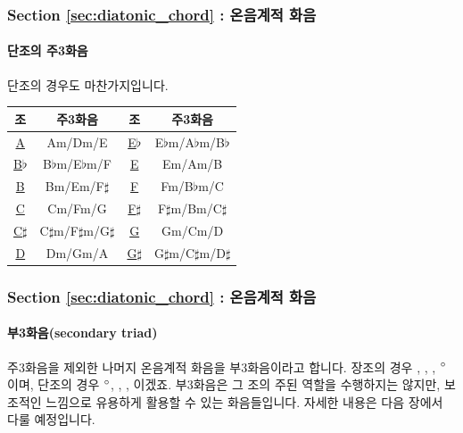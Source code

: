 \documentclass{beamer}
\newcommand{\Rn}[1]{%
	\textup{\uppercase\expandafter{\romannumeral#1}}%
}
\newcommand{\rn}[1]{%
	\textup{\lowercase\expandafter{\romannumeral#1}}%
}
\begin{document}
	\begin{frame}
		\frametitle{Section \ref{sec:diatonic_chord} : 온음계적 화음}
		\framesubtitle{단조의 주3화음}
		단조의 경우도 마찬가지입니다.
		\begin{table}
			\begin{tabular}{||c|c||c|c||}
				\hline
				조 & 주3화음 & 조 & 주3화음 \\ \hline
				{\color{cyan}\href{run:res/mp3/10/chord/primary_minor_triad_A.mp3}{A}} & Am/Dm/E & {\color{cyan}\href{run:res/mp3/10/chord/primary_minor_triad_E_flat.mp3}{E$\flat$}} & E$\flat$m/A$\flat$m/B$\flat$ \\ \hline
				{\color{cyan}\href{run:res/mp3/10/chord/primary_minor_triad_B_flat.mp3}{B$\flat$}} & B$\flat$m/E$\flat$m/F& {\color{cyan}\href{run:res/mp3/10/chord/primary_minor_triad_E.mp3}{E}} & Em/Am/B \\ \hline
				{\color{cyan}\href{run:res/mp3/10/chord/primary_minor_triad_B.mp3}{B}} & Bm/Em/F$\sharp$ &  {\color{cyan}\href{run:res/mp3/10/chord/primary_minor_triad_F.mp3}{F}} & Fm/B$\flat$m/C \\ \hline
				{\color{cyan}\href{run:res/mp3/10/chord/primary_minor_triad_C.mp3}{C}} & Cm/Fm/G& {\color{cyan}\href{run:res/mp3/10/chord/primary_minor_triad_F_sharp.mp3}{F$\sharp$}} & F$\sharp$m/Bm/C$\sharp$ \\ \hline
				{\color{cyan}\href{run:res/mp3/10/chord/primary_minor_triad_C_sharp.mp3}{C$\sharp$}} & C$\sharp$m/F$\sharp$m/G$\sharp$ & {\color{cyan}\href{run:res/mp3/10/chord/primary_minor_triad_G.mp3}{G}} & Gm/Cm/D \\ \hline
				{\color{cyan}\href{run:res/mp3/10/chord/primary_minor_triad_D.mp3}{D}} & Dm/Gm/A & {\color{cyan}\href{run:res/mp3/10/chord/primary_minor_triad_G_sharp.mp3}{G$\sharp$}} & G$\sharp$m/C$\sharp$m/D$\sharp$ \\ \hline 
			\end{tabular}
		\end{table}
	\end{frame}
	
	\begin{frame}
		\frametitle{Section \ref{sec:diatonic_chord} : 온음계적 화음}
		\framesubtitle{부3화음(secondary triad)}
		주3화음을 제외한 나머지 온음계적 화음을 부3화음이라고 합니다. 장조의 경우 \rn{2}, \rn{3}, \rn{6}, \rn{7}$\degree$이며, 단조의 경우 \rn{2}$\degree$, \Rn{3}, \Rn{6}, \Rn{7}이겠죠. 부3화음은 그 조의 주된 역할을 수행하지는 않지만, 보조적인 느낌으로 유용하게 활용할 수 있는 화음들입니다. 자세한 내용은 다음 장에서 다룰 예정입니다.
	\end{frame}
	
\end{document}
